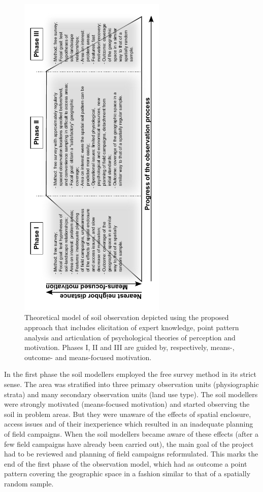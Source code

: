\begin{figure}[!h]
 \centering
 \includegraphics[width=7cm,angle=-90]{fig/chap06-observation-model.pdf}
 \caption{Theoretical model of soil observation depicted using the proposed approach that includes elicitation 
 of expert knowledge, point pattern analysis and articulation of psychological theories of perception and 
 motivation. Phases I, II and III are guided by, respectively, means-, outcome- and means-focused motivation.}
 \label{fig:chap06-model}
\end{figure}

In the first phase the soil modellers employed the free survey method in its strict sense. The area was 
stratified into three primary observation units (physiographic strata) and many secondary observation units 
(land use type). The soil modellers were strongly motivated (means-focused motivation) and started observing 
the soil in problem areas. But they were unaware of the effects of spatial enclosure, access issues and of 
their inexperience which resulted in an inadequate planning of field campaigns. When the soil modellers became
aware of these effects (after a few field campaigns have already been carried out), the main goal of the 
project had to be reviewed and planning of field campaigns reformulated. This marks the end of the first phase 
of the observation model, which had as outcome a point pattern covering the geographic space in a fashion 
similar to that of a spatially random sample.

